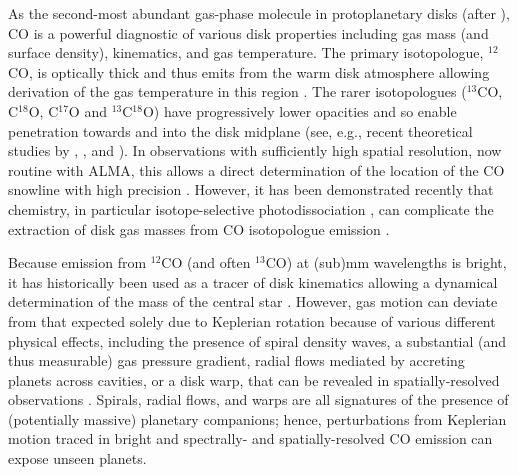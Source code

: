 \documentclass[onecolumn]{aastex6}
\begin{document}
As the second-most abundant gas-phase molecule in protoplanetary disks
(after ), CO is a powerful diagnostic of various disk properties
including gas mass (and surface density), kinematics, and gas temperature.
The primary isotopologue, $^{12}$CO, is optically thick and thus emits
from the warm disk atmosphere allowing derivation of the gas temperature
in this region \citep[e.g.,][]{williams11,dutrey14}.
The rarer isotopologues ($^{13}$CO, C$^{18}$O, C$^{17}$O and $^{13}$C$^{18}$O)
have progressively lower opacities and so enable penetration
towards and into the disk midplane
(see, e.g., recent theoretical studies by \citealt{bruderer13},
\citealt{miotello16}, and \citealt{yu16}).
In observations with sufficiently high spatial resolution, now routine with ALMA,
this allows a direct determination of the location of the CO snowline
with high precision \citep[see, e.g.,][]{nomura16,schwarz16,zhang17}.
However, it has been demonstrated recently that chemistry, in particular
isotope-selective photodissociation \citep{visser09}, can complicate
the extraction of disk gas masses from CO isotopologue emission
\citep{miotello14,miotello16}.

Because emission from $^{12}$CO (and often $^{13}$CO) at (sub)mm wavelengths
is bright, it has historically been used as a tracer of disk kinematics allowing
a dynamical determination of the mass of the central star \citep[e.g.,][]{simon00}.
However, gas motion can deviate from that expected solely due to
Keplerian rotation because of various different physical effects, including
the presence of spiral density waves, a substantial (and thus measurable)
gas pressure gradient, radial flows mediated by accreting planets
across cavities, or a disk warp, that can be revealed in spatially-resolved
observations
\citep[see, e.g.,][]{rosenfeld12,tang12,casassus13,rosenfeld14,christiaens14,casassus15}.
Spirals, radial flows, and warps are all signatures of the presence
of (potentially massive) planetary companions;
hence, perturbations from Keplerian motion traced in
bright and spectrally- and spatially-resolved CO emission
can expose unseen planets.
\end{document}
